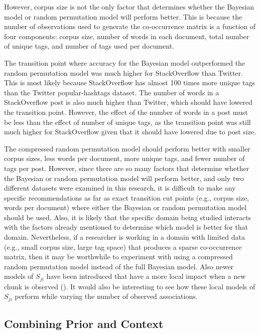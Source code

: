 \documentclass[man,floatsintext,donotrepeattitle]{apa6}
\begin{document}
However, corpus size is not the only factor that determines whether the Bayesian model or random permutation model will perform better.
This is because the number of observations used to generate the co-occurrence matrix is a function of four components:
corpus size, number of words in each document, total number of unique tags, and number of tags used per document.

The transition point where accuracy for the Bayesian model outperformed the random permutation model was much higher for StackOverflow than Twitter.
This is most likely because StackOverflow has almost \num{100} times more unique tags than the Twitter popular-hashtags dataset.
The number of words in a StackOverflow post is also much higher than Twitter, which should have lowered the transition point.
However, the effect of the number of words in a post must be less than the effect of number of unique tags, as the transition point was still much higher for StackOverflow given that it should have lowered due to post size.

The compressed random permutation model should perform better with smaller corpus sizes, less words per document, more unique tags, and fewer number of tags per post.
However, since there are so many factors that determine whether the Bayesian or random permutation model will perform better,
and only two different datasets were examined in this research,
it is difficult to make any specific recommendations as far as exact transition cut points (e.g., corpus size, words per document) where either the Bayesian or random permutation model should be used.
Also, it is likely that the specific domain being studied interacts with the factors already mentioned to determine which model is better for that domain.
Nevertheless, if a researcher is working in a domain with limited data (e.g., small corpus size, large tag space) that produces a sparse co-occurrence matrix,
then it may be worthwhile to experiment with using a compressed random permutation model instead of the full Bayesian model.
Also newer models of $S_{ji}$ have been introduced that have a more local impact when a new chunk is observed (\parencite{thomson2013constraining}).
It would also be interesting to see how these local models of $S_{ji}$ perform while varying the number of observed associations.

\subsection{Combining Prior and Context}
\end{document}
